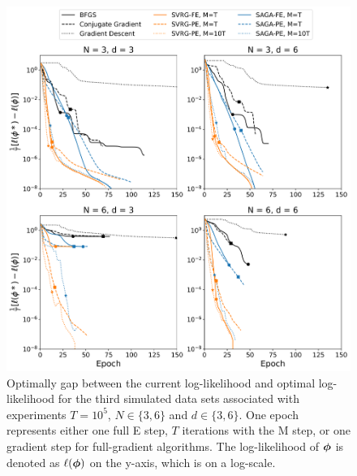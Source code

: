 \documentclass[12pt]{article}
\begin{document}
\begin{figure}[H]
    \centering
    \includegraphics[width=6.5in]{../plt/log-like_v_epoch_T-100000-002.png}
    \caption{Optimally gap between the current log-likelihood and optimal log-likelihood for the third simulated data sets associated with experiments $T=10^{5}$, $N \in \{3,6\}$ and $d \in \{3,6\}$. One epoch represents either one full E step, $T$ iterations with the M step, or one gradient step for full-gradient algorithms. The log-likelihood of $\boldsymbol{\phi}$ is denoted as $\ell(\boldsymbol{\phi})$ on the y-axis, which is on a log-scale.}
\end{figure}
%
\end{document}
